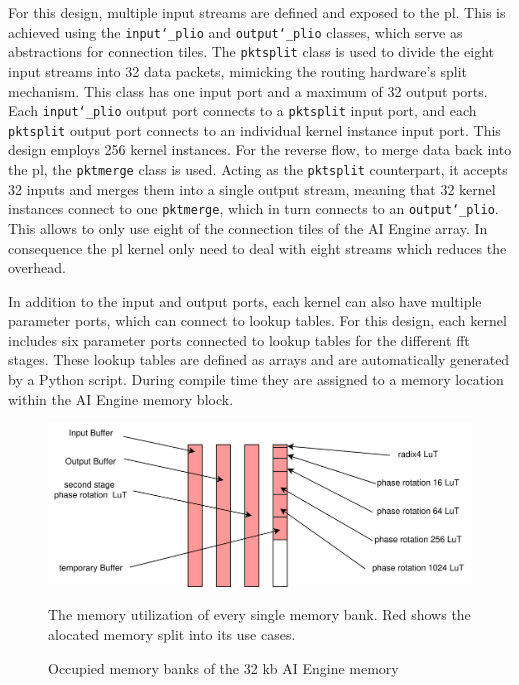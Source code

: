 For this design, multiple input streams are defined and exposed to the \ac{pl}. This is achieved using the \texttt{input\char`_plio} and \texttt{output\char`_plio} classes, which serve as abstractions for connection tiles. The \texttt{pktsplit} class is used to divide the eight input streams into 32 data packets, mimicking the routing hardware's split mechanism. This class has one input port and a maximum of 32 output ports. Each \texttt{input\char`_plio} output port connects to a \texttt{pktsplit} input port, and each \texttt{pktsplit} output port connects to an individual kernel instance input port. This design employs 256 kernel instances. For the reverse flow, to merge data back into the \ac{pl}, the \texttt{pktmerge} class is used. Acting as the \texttt{pktsplit} counterpart, it accepts 32 inputs and merges them into a single output stream, meaning that 32 kernel instances connect to one \texttt{pktmerge}, which in turn connects to an \texttt{output\char`_plio}. This allows to only use eight of the connection tiles of the AI Engine array. In consequence the \ac{pl} kernel only need to deal with eight streams which reduces the overhead.\par
In addition to the input and output ports, each kernel can also have multiple parameter ports, which can connect to lookup tables. For this design, each kernel includes six parameter ports connected to lookup tables for the different \ac{fft} stages. These lookup tables are defined as arrays and are automatically generated by a Python script. During compile time they are assigned to a memory location within the AI Engine memory block.

\begin{figure}[h]
    \centering
    \includegraphics[width=1.0\textwidth]{images/memory_structure.png}
    \captionsetup{justification=centering}
    \caption{Occupied memory banks of the 32 kb AI Engine memory}
        The memory utilization of every single memory bank. Red shows the alocated memory split into its use cases.
    \label{fig:memory_structure}
\end{figure}

